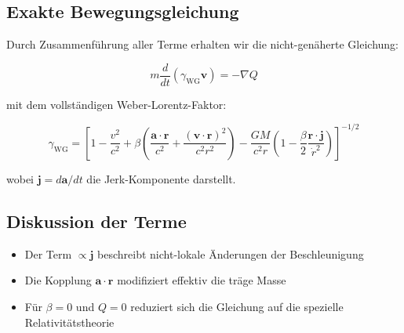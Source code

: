 \subsection{Exakte Bewegungsgleichung}
Durch Zusammenführung aller Terme erhalten wir die nicht-genäherte Gleichung:

\begin{equation}
\boxed{
m\frac{d}{dt}\left(\gamma_{\text{WG}}\mathbf{v}\right) = -\nabla Q
}
\end{equation}

mit dem vollständigen Weber-Lorentz-Faktor:

\begin{equation}
\gamma_{\text{WG}} = \left[1 - \frac{v^2}{c^2} + \beta\left(\frac{\mathbf{a}\cdot\mathbf{r}}{c^2} + \frac{(\mathbf{v}\cdot\mathbf{r})^2}{c^2r^2}\right) - \frac{GM}{c^2r}\left(1 - \frac{\beta}{2}\frac{\mathbf{r}\cdot\mathbf{j}}{\dot{r}^2}\right)\right]^{-1/2}
\end{equation}

wobei $\mathbf{j} = d\mathbf{a}/dt$ die Jerk-Komponente darstellt.

\subsection{Diskussion der Terme}
\begin{itemize}
\item Der Term $\propto \mathbf{j}$ beschreibt nicht-lokale Änderungen der Beschleunigung
\item Die Kopplung $\mathbf{a}\cdot\mathbf{r}$ modifiziert effektiv die träge Masse
\item Für $\beta=0$ und $Q=0$ reduziert sich die Gleichung auf die spezielle Relativitätstheorie
\end{itemize}
